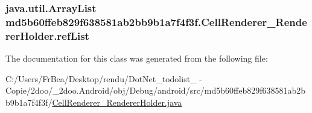 \hypertarget{classmd5b60ffeb829f638581ab2bb9b1a7f4f3f_1_1_cell_renderer___renderer_holder_5816b2be32fb4cd9e5417611fa927491}{
\subsubsection[{refList}]{\setlength{\rightskip}{0pt plus 5cm}java.util.ArrayList {\bf md5b60ffeb829f638581ab2bb9b1a7f4f3f.CellRenderer\_\-RendererHolder.refList}}}
\label{classmd5b60ffeb829f638581ab2bb9b1a7f4f3f_1_1_cell_renderer___renderer_holder_5816b2be32fb4cd9e5417611fa927491}




The documentation for this class was generated from the following file:\begin{CompactItemize}
\item 
C:/Users/FrBea/Desktop/rendu/DotNet\_\-todolist\_ - Copie/2doo/\_\-2doo.Android/obj/Debug/android/src/md5b60ffeb829f638581ab2bb9b1a7f4f3f/\hyperlink{_cell_renderer___renderer_holder_8java}{CellRenderer\_\-RendererHolder.java}\end{CompactItemize}
